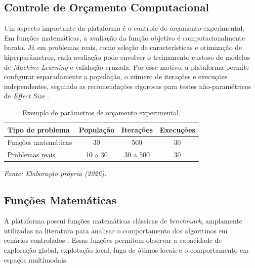 \documentclass[12pt, a4paper, oneside]{report}
\begin{document}
\subsection{Controle de Orçamento Computacional}
Um aspecto importante da plataforma é o controle do orçamento experimental. Em funções matemáticas, a avaliação da função objetivo é computacionalmente barata. Já em problemas reais, como seleção de características e otimização de hiperparâmetros, cada avaliação pode envolver o treinamento custoso de modelos de \textit{Machine Learning} e validação cruzada. Por esse motivo, a plataforma permite configurar separadamente a população, o número de iterações e execuções independentes, seguindo as recomendações rigorosas para testes não-paramétricos de \textit{Effect Size} \citep{ismail2026beyond}.

\begin{table}[htbp] 
\centering 
\caption{Exemplo de parâmetros de orçamento experimental.} 
\vspace{0.2cm}
\begin{tabular}{lccc} 
\toprule 
\textbf{Tipo de problema} & \textbf{População} & \textbf{Iterações} & \textbf{Execuções}\\ 
\midrule 
Funções matemáticas & 30 & 500 & 30\\ 
Problemas reais & 10 a 30 & 30 a 500 & 30\\ 
\bottomrule 
\end{tabular} 
\par\vspace{0.2cm}
\centerline{\small \textit{Fonte: Elaboração própria (2026).}}
\label{tab:orcamento-plataforma} 
\end{table}

\subsection{Funções Matemáticas}

A plataforma possui funções matemáticas clássicas de \textit{benchmark}, amplamente utilizadas na literatura para analisar o comportamento dos algoritmos em cenários controlados \citep{ismail2026beyond}. Essas funções permitem observar a capacidade de exploração global, explotação local, fuga de ótimos locais e o comportamento em espaços multimodais.
\end{document}

